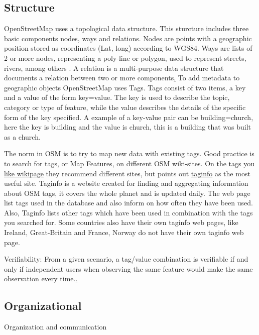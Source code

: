 \subsection{Structure}
OpenStreetMap uses a topological data structure. This sturcture includes three basic components nodes, ways and relations. Nodes are points with a geographic position stored as coordinates (Lat, long) according to WGS84. Ways are lists of 2 or more nodes, representing a poly-line or polygon, used to represent streets, rivers, among others \cite{Debruyne2015}. A relation is a multi-purpose data structure that documents a relation between two or more components\href{https://wiki.openstreetmap.org/wiki/Elements}. To add metadata to geographic objects OpenStreetMap uses Tags. Tags consist of two items, a key and a value of the form key=value. The key is used to describe the topic, category or type of feature, while the value describes the details of the specific form of the key specified. A example of a key-value pair can be building=church, here the key is building and the value is church, this is a building that was built as a church. 

The norm in OSM is to try to map new data with existing tags. Good practice is to search for tags, or Map Features, on different OSM wiki-sites. On the \href{http://wiki.openstreetmap.org/wiki/Any_tags_you_like}{tags you like wikipage} they recommend different sites, but points out \href{http://taginfo.openstreetmap.org/}{taginfo} as the most useful site. Taginfo is a website created for finding and aggregating information about OSM tags, it covers the whole planet and is updated daily. The web page list tags used in the database and also inform on how often they have been used. Also, Taginfo lists other tags which have been used in combination with the tags you searched for. Some countries also have their own taginfo web pages, like Ireland, Great-Britain and France, Norway do not have their own taginfo web page. 

Verifiability: From a given scenario, a tag/value combination is verifiable if and only if independent users when observing the same feature would make the same observation every time.\href{http://wiki.openstreetmap.org/wiki/Verifiability}. 

\subsection{Organizational}
Organization and communication 

